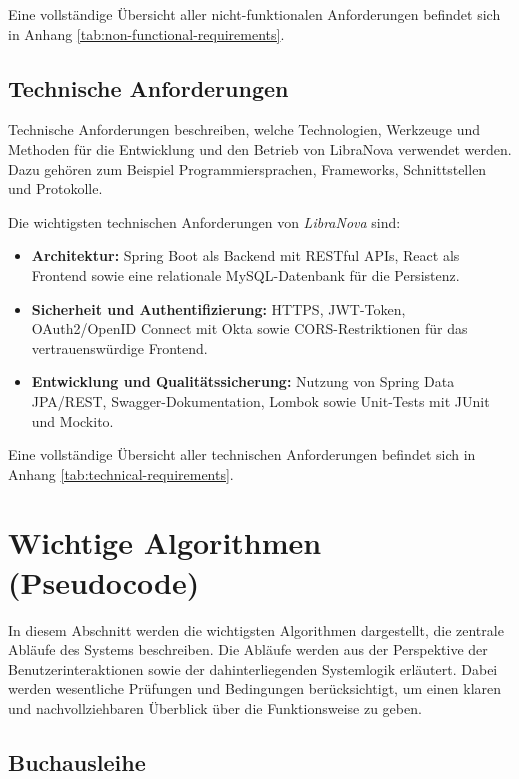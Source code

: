 \noindent Eine vollständige Übersicht aller nicht-funktionalen Anforderungen befindet sich in Anhang \ref{tab:non-functional-requirements}.

\subsection{Technische  Anforderungen}

Technische Anforderungen beschreiben, welche Technologien, Werkzeuge und Methoden für die Entwicklung und den Betrieb von LibraNova verwendet werden. Dazu gehören zum Beispiel Programmiersprachen, Frameworks, Schnittstellen und Protokolle.

\noindent Die wichtigsten technischen Anforderungen von \textit{LibraNova} sind:
\begin{itemize}
	\item \textbf{Architektur:} Spring Boot als Backend mit RESTful APIs, React als Frontend sowie eine relationale MySQL-Datenbank für die Persistenz.  
	\item \textbf{Sicherheit und Authentifizierung:} HTTPS, JWT-Token, OAuth2/OpenID Connect mit Okta sowie CORS-Restriktionen für das vertrauenswürdige Frontend.  
	\item \textbf{Entwicklung und Qualitätssicherung:} Nutzung von Spring Data JPA/REST, Swagger-Dokumentation, Lombok sowie Unit-Tests mit JUnit und Mockito.  
\end{itemize}

\noindent Eine vollständige Übersicht aller technischen Anforderungen befindet sich in Anhang \ref{tab:technical-requirements}.

\section{Wichtige Algorithmen (Pseudocode)}

In diesem Abschnitt werden die wichtigsten Algorithmen dargestellt, die zentrale Abläufe des Systems beschreiben. Die Abläufe werden aus der Perspektive der Benutzerinteraktionen sowie der dahinterliegenden Systemlogik erläutert. Dabei werden wesentliche Prüfungen und Bedingungen berücksichtigt, um einen klaren und nachvollziehbaren Überblick über die Funktionsweise zu geben.

\subsection{Buchausleihe}


